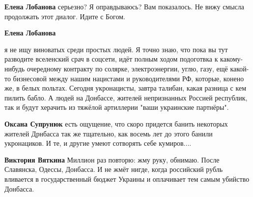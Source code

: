 \begin{itemize}
\begin{itemize}
 
\textbf{Елена Лобанова} серьезно? Я оправдываюсь? Вам показалось. Не вижу смысла продолжать этот диалог. Идите с Богом.

 
\textbf{Елена Лобанова} 

я не ищу виноватых среди простых людей. Я точно знаю,
что пока вы тут разводите вселенский срач в соцсети, идёт полным ходом
подоготвка к какому-нибудь очередному контракту по солярке, электроэнергии,
углю, газу, ещё какой-то бизнесовой между нашим нацистами и руководителями РФ,
которые, конено же, в белых польтах. Сегодня укронацисты, завтра талибан, какая
разница с кем пилить бабло. А людей на Донбассе, жителей непризнанных Россией
республик, так и будут херачить из тяжёлой артиллерии "ваши украинские
партнёры".

 
\textbf{Оксана Супрунюк} есть ощущение, что скоро придется банить некоторых
жителей Дрнбасса так же тщательно, как восемь лет до этого банили укронациков.
И те, и другие умеют сотворять себе кумиров....

 
\textbf{Виктория Вяткина} Миллион раз повторю: жму руку, обнимаю. После Славянска, Одессы, Донбасса. И не жмёт нигде, когда российский рубль вливается в государственный бюджет Украины и оплачивает тем самым убийство Донбасса.

 

\end{itemize}
\end{itemize}
